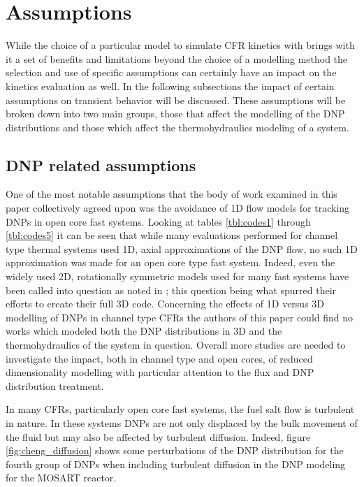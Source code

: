 \documentclass[review]{elsarticle}
\begin{document}
\section{Assumptions} \label{sec:asm}
While the choice of a particular model to simulate CFR kinetics with brings
with it a set of benefits and limitations beyond the choice of a modelling
method the selection and use of specific assumptions can certainly have an
impact on the kinetics evaluation as well. In the following subsections the
impact of certain assumptions on transient behavior will be discussed. These
assumptions will be broken down into two main groups, those that affect the
modelling of the DNP distributions and those which affect the thermohydraulics
modeling of a system.

\subsection{DNP related assumptions} \label{ssec:dnp_asm}
One of the most notable assumptions
that the body of work examined in this paper collectively agreed upon was the
avoidance of 1D flow models for tracking DNPs in open core fast systems. Looking
at tables \ref{tbl:codes1} through \ref{tbl:codes5}
 it can be seen that while many evaluations performed
for channel type thermal systems used 1D, axial approximations of the DNP
flow, no such 1D approximation was made for an open core type fast system.
Indeed, even the widely used 2D, rotationally symmetric models used for many
fast systems have been called into question as noted in
\cite{aufiero_development_2014}; this question being what spurred their efforts
to create their full 3D code. Concerning the effects of 1D versus 3D modelling
of DNPs in channel type CFRs the authors of this paper could find no works
which modeled both the DNP distributions in 3D and the thermohydraulics of
the system in question. Overall more studies are needed to investigate the
impact, both in channel type and open cores, of reduced dimensionality
modelling with particular attention to the flux and DNP distribution treatment.
\par In many CFRs, particularly open core fast systems, the fuel salt flow is
turbulent in nature. In these systems DNPs are not only displaced by the
bulk movement of the fluid but may also be affected by turbulent diffusion.
Indeed, figure \ref{fig:cheng_diffusion} shows some perturbations of the DNP
distribution for the fourth group of DNPs when including turbulent diffusion
in the DNP modeling for the MOSART reactor.
\end{document}
